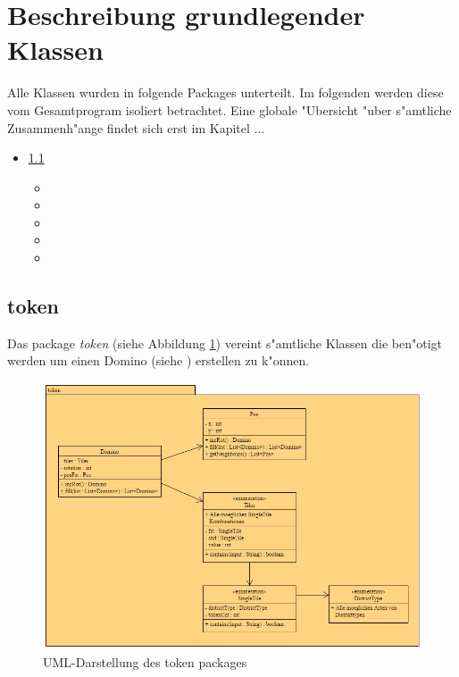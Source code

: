 \section{Beschreibung grundlegender Klassen}
Alle Klassen wurden in folgende Packages unterteilt. Im folgenden werden diese vom Gesamtprogram isoliert betrachtet. Eine globale "Ubersicht "uber s"amtliche Zusammenh"ange findet sich erst im Kapitel ...
\begin{itemize}
	\item \ref{ss:token} 
	\begin{itemize}
		\item {}
		\item {}
		\item {}
		\item {}
		\item {}
	\end{itemize}
\end{itemize}

\newpage
\subsection{token}
\label{ss:token}
Das package \emph{token} (siehe Abbildung \ref{fig:tokenPackage}) vereint s"amtliche Klassen die ben"otigt werden um einen Domino (siehe ) erstellen zu k"onnen. 

\begin{figure}
	\centering
	\includegraphics{pics/tokenPackage}
	\caption{UML-Darstellung des token packages}
	\label{fig:tokenPackage}
\end{figure}

